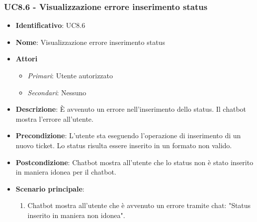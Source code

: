 \subsubsection{UC8.6 - Visualizzazione errore inserimento status}
\begin{itemize}
	\item \textbf{Identificativo}: UC8.6
	\item \textbf{Nome}: Visualizzazione errore inserimento status 
	\item \textbf{Attori}
	\begin{itemize} 
		\item \textit{Primari}: Utente autorizzato
		\item \textit{Secondari}: Nessuno
	\end{itemize}
	\item \textbf{Descrizione}: È avvenuto un errore nell'inserimento dello status. Il chatbot mostra l'errore all'utente.
	\item \textbf{Precondizione}: L'utente sta eseguendo l'operazione di inserimento di un nuovo ticket. Lo status risulta essere inserito in un formato non valido. 
	\item \textbf{Postcondizione}: Chatbot mostra all'utente che lo status non è stato inserito in maniera idonea per il chatbot.
	\item \textbf{Scenario principale}: 
	\begin{enumerate}
		\item Chatbot mostra all'utente che è avvenuto un errore tramite chat: "Status inserito in maniera non idonea". 
	\end{enumerate}
\end{itemize}
